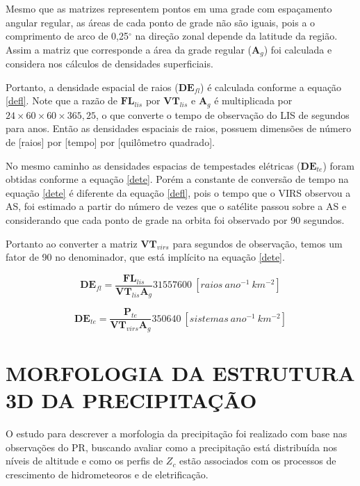Mesmo que as matrizes representem pontos em uma grade com espaçamento angular regular, as áreas de cada ponto de grade não são iguais, pois a  o comprimento de arco de 0,25$^{\circ}$ na direção zonal depende da latitude da região. Assim a matriz que corresponde a área da grade regular ($\mathbf{A}_g$) foi calculada e considera nos cálculos de densidades superficiais.


Portanto, a densidade espacial de raios ($\mathbf{DE}_{fl}$) é calculada conforme a equação \ref{defl}. Note que a razão de $\mathbf{FL}_{lis}$ por $\mathbf{VT}_{lis}$ e $\mathbf{A}_g$ é multiplicada por $24\times60\times60\times365,25$, o que converte o tempo de observação do LIS de segundos para anos. Então as densidades espaciais de raios, possuem dimensões de número de [raios] por [tempo] por [quilômetro quadrado].

No mesmo caminho as densidades espacias de tempestades elétricas ($\mathbf{DE}_{te}$) foram obtidas conforme a equação \ref{dete}. Porém a constante de conversão de tempo na equação \ref{dete} é diferente da equação \ref{defl}, pois o tempo que o VIRS observou a AS, foi estimado a partir do número de vezes que o satélite passou sobre a AS e considerando que cada ponto de grade na orbita foi observado por 90 segundos. 

Portanto ao converter a matriz $\mathbf{VT}_{virs}$ para segundos de observação, temos um fator de 90 no denominador, que está implícito na equação \ref{dete}. 


\begin{equation}
\mathbf{DE}_{fl} = \frac{\mathbf{FL}_{lis}}{\mathbf{VT}_{lis} \mathbf{A}_g} 31557600 ~[raios~ano^{-1}~km^{-2}]    
\label{defl}
\end{equation}

\begin{equation}
\mathbf{DE}_{te} = \frac{\mathbf{P}_{te}}{\mathbf{VT}_{virs} \mathbf{A}_g} 350640 ~[sistemas~ano^{-1}~km^{-2}]    
\label{dete}
\end{equation}

\section{MORFOLOGIA DA ESTRUTURA 3D DA PRECIPITAÇÃO}


O estudo para descrever a morfologia da precipitação foi realizado com base nas observações do PR, buscando avaliar como a precipitação está distribuída nos níveis de altitude e como os perfis de $Z_c$ estão associados com os processos de crescimento de hidrometeoros e de eletrificação.  

